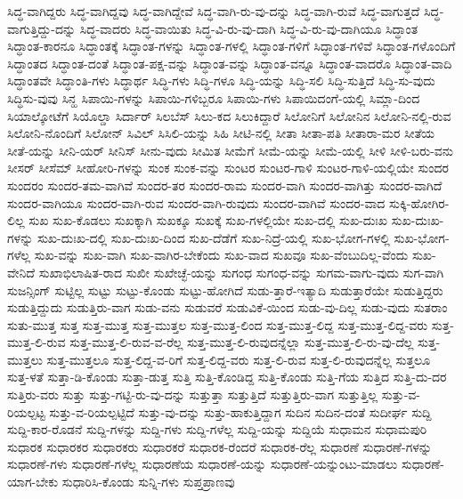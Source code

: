 {ಸಿದ್ಧ-ವಾಗಿದ್ದರು
ಸಿದ್ಧ-ವಾಗಿದ್ದವು
ಸಿದ್ಧ-ವಾಗಿದ್ದೇವೆ
ಸಿದ್ಧ-ವಾಗಿ-ರು-ವು-ದನ್ನು
ಸಿದ್ಧ-ವಾಗಿ-ರುವೆ
ಸಿದ್ಧ-ವಾಗುತ್ತದೆ
ಸಿದ್ಧ-ವಾಗುತ್ತಿದ್ದು-ದನ್ನು
ಸಿದ್ಧ-ವಾದರು
ಸಿದ್ಧ-ವಾಯಿತು
ಸಿದ್ಧ-ವಿ-ರು-ವು-ದಾಗಿ
ಸಿದ್ಧ-ವಿ-ರು-ವು-ದಾಗಿಯೂ
ಸಿದ್ಧಾಂತ
ಸಿದ್ಧಾಂತ-ಕಾರನೂ
ಸಿದ್ಧಾಂತಕ್ಕೆ
ಸಿದ್ಧಾಂತ-ಗಳನ್ನು
ಸಿದ್ಧಾಂತ-ಗಳಲ್ಲಿ
ಸಿದ್ಧಾಂತ-ಗಳಿಗೆ
ಸಿದ್ಧಾಂತ-ಗಳಿವೆ
ಸಿದ್ಧಾಂತ-ಗಳೊಂದಿಗೆ
ಸಿದ್ಧಾಂತದ
ಸಿದ್ಧಾಂತ-ದಂತೆ
ಸಿದ್ಧಾಂತ-ಪಕ್ಷ-ವನ್ನು
ಸಿದ್ಧಾಂತ-ವನ್ನು
ಸಿದ್ಧಾಂತ-ವನ್ನೂ
ಸಿದ್ಧಾಂತ-ವಾದರೊ
ಸಿದ್ಧಾಂತ-ವಾದಿ
ಸಿದ್ಧಾಂತವೇ
ಸಿದ್ಧಾಂತಿ-ಗಳು
ಸಿದ್ಧಾರ್ಥ
ಸಿದ್ಧಿ-ಗಳು
ಸಿದ್ಧಿ-ಗಳೂ
ಸಿದ್ಧಿ-ಯನ್ನು
ಸಿದ್ಧಿ-ಸಲಿ
ಸಿದ್ಧಿ-ಸುತ್ತಿದೆ
ಸಿದ್ಧಿ-ಸು-ವುದು
ಸಿದ್ಧಿಸು-ವುವು
ಸಿನ್ಹ
ಸಿಪಾಯಿ-ಗಳನ್ನು
ಸಿಪಾಯಿ-ಗಳಿಬ್ಬರೂ
ಸಿಪಾಯಿ-ಗಳು
ಸಿಪಾಯಿದಂಗೆ-ಯಲ್ಲಿ
ಸಿಮ್ಲಾ-ದಿಂದ
ಸಿಯಾಲ್ಕೋಟೆಗೆ
ಸಿಯೊಲ್ಡಾ
ಸಿರ್ದಾರ್
ಸಿಲಬೆಸ್
ಸಿಲು-ಕದ
ಸಿಲುಕಿದ್ದಾರೆ
ಸಿಲೋನಿಗೆ
ಸಿಲೋನಿನ
ಸಿಲೋನಿ-ನಲ್ಲಿ-ರುವ
ಸಿಲೋನಿ-ನೊಂದಿಗೆ
ಸಿಲೋನ್
ಸಿವಿಲ್
ಸಿಸಿಲಿ-ಯನ್ನು
ಸಿಹಿ
ಸೀಟಿ-ನಲ್ಲಿ
ಸೀತಾ
ಸೀತಾ-ಪತಿ
ಸೀತಾರಾ-ಮರ
ಸೀತೆಯ
ಸೀತೆ-ಯನ್ನು
ಸೀನಿ-ಯರ್
ಸೀನಿಸ್
ಸೀನು-ವುದು
ಸೀಮಿತ
ಸೀಮೆಗೆ
ಸೀಮೆ-ಯನ್ನು
ಸೀಮೆ-ಯಲ್ಲಿ
ಸೀಳಿ
ಸೀಳಿ-ಬರು-ವನು
ಸೀಸರ್
ಸೀಸೆಮ್
ಸೀಹೋರಿ-ಗಳನ್ನು
ಸುಂಕ
ಸುಂಕ-ವನ್ನು
ಸುಂಟರ
ಸುಂಟರ-ಗಾಳಿ
ಸುಂಟರ-ಗಾಳಿ-ಯಲ್ಲಿಯೇ
ಸುಂದರ
ಸುಂದರಂ
ಸುಂದರ-ತಮ-ವಾಗಿವೆ
ಸುಂದರ-ತರ
ಸುಂದರ-ರಾಮ
ಸುಂದರ-ವಾಗಿ
ಸುಂದರ-ವಾಗಿತ್ತು
ಸುಂದರ-ವಾಗಿದೆ
ಸುಂದರ-ವಾಗಿಯೂ
ಸುಂದರ-ವಾಗಿ-ರುವ
ಸುಂದರ-ವಾಗಿ-ರುವುದು
ಸುಂದರ-ವಾಗಿವೆ
ಸುಂದರ-ವಾದ
ಸುಕ್ಕಿ-ಹೋಗಿರ-ಲಿಲ್ಲ
ಸುಖ
ಸುಖ-ಕೊಡಲು
ಸುಖಕ್ಕಾಗಿ
ಸುಖಕ್ಕೂ
ಸುಖಕ್ಕೆ
ಸುಖ-ಗಳಲ್ಲಿಯೇ
ಸುಖ-ದಲ್ಲಿ
ಸುಖ-ದುಃಖ
ಸುಖ-ದುಃಖ-ಗಳನ್ನು
ಸುಖ-ದುಃಖ-ದಲ್ಲಿ
ಸುಖ-ದುಃಖ-ದಿಂದ
ಸುಖ-ದೆಡೆಗೆ
ಸುಖ-ನಿದ್ರೆ-ಯಲ್ಲಿ
ಸುಖ-ಭೋಗ-ಗಳಲ್ಲಿ
ಸುಖ-ಭೋಗ-ಗಳೆಲ್ಲ
ಸುಖ-ವನ್ನು
ಸುಖ-ವಾಗಿ
ಸುಖ-ವಾಗಿರ-ಬೇಕೆಂದು
ಸುಖ-ವಾದ
ಸುಖವೂ
ಸುಖ-ವೆಂಬುದಿಲ್ಲ-ವೆಂದು
ಸುಖ-ವೇನಿದೆ
ಸುಖಾಭಿಲಾಷಿತ-ರಾದ
ಸುಖೀ
ಸುಖೇಚ್ಛೆ-ಯನ್ನು
ಸುಗಂಧ
ಸುಗಂಧ-ವನ್ನು
ಸುಗಮ-ವಾಗು-ವುದು
ಸುಗ-ವಾಗಿ
ಸುಜನ್ಸಿಂಗ್
ಸುಟ್ಟಿಲ್ಲ
ಸುಟ್ಟು
ಸುಟ್ಟು-ಕೊಂಡು
ಸುಟ್ಟು-ಹೋಗಿದೆ
ಸುಡು-ತ್ತಾರೆ-ಇತ್ಯಾದಿ
ಸುಡುತ್ತಾರೆಯೇ
ಸುಡುತ್ತಿದ್ದರು
ಸುಡುತ್ತಿದ್ದುದು
ಸುಡುತ್ತಿರು-ವಾಗ
ಸುಡು-ವನು
ಸುಡುವರೆ
ಸುಡುವಿಕೆ-ಯಿಂದ
ಸುಡು-ವು-ದಿಲ್ಲ
ಸುಡು-ವುದು
ಸುತರಾಂ
ಸುತು-ಮುತ್ತ
ಸುತ್ತ
ಸುತ್ತ-ಮುತ್ತ
ಸುತ್ತ-ಮುತ್ತಲ
ಸುತ್ತ-ಮುತ್ತ-ಲಿಂದ
ಸುತ್ತ-ಮುತ್ತ-ಲಿದ್ದ
ಸುತ್ತ-ಮುತ್ತ-ಲಿದ್ದ-ವರು
ಸುತ್ತ-ಮುತ್ತ-ಲಿ-ರುವ
ಸುತ್ತ-ಮುತ್ತ-ಲಿ-ರುವ-ವ-ರೆಲ್ಲ
ಸುತ್ತ-ಮುತ್ತ-ಲಿ-ರುವುದನ್ನೆಲ್ಲಾ
ಸುತ್ತ-ಮುತ್ತ-ಲಿ-ರು-ವು-ದೆಲ್ಲ
ಸುತ್ತ-ಮುತ್ತಲು
ಸುತ್ತ-ಮುತ್ತಲೂ
ಸುತ್ತ-ಲಿದ್ದ-ವ-ರಿಗೆ
ಸುತ್ತ-ಲಿದ್ದ-ವರು
ಸುತ್ತ-ಲಿ-ರುವ
ಸುತ್ತ-ಲಿ-ರುವುದನ್ನೆಲ್ಲ
ಸುತ್ತಲೂ
ಸುತ್ತ-ಳತೆ
ಸುತ್ತಾ-ಡಿ-ಕೊಂಡು
ಸುತ್ತಾ-ಡುತ್ತ
ಸುತ್ತಿ
ಸುತ್ತಿ-ಕೊಂಡಿದ್ದ
ಸುತ್ತಿ-ಕೊಂಡು
ಸುತ್ತಿ-ಗೆಯ
ಸುತ್ತಿದ
ಸುತ್ತಿ-ದು-ದರ
ಸುತ್ತಿರು-ವರು
ಸುತ್ತು
ಸುತ್ತು-ಗಟ್ಟಿ-ರು-ವು-ದನ್ನು
ಸುತ್ತುತ್ತಾ
ಸುತ್ತುತ್ತಿದೆ
ಸುತ್ತುತ್ತಿರು-ವಾಗ
ಸುತ್ತುತ್ತಿಲ್ಲ
ಸುತ್ತು-ವ-ರಿಯಲ್ಪಟ್ಟ
ಸುತ್ತು-ವ-ರಿಯಲ್ಪಟ್ಟಿದೆ
ಸುತ್ತು-ವು-ದನ್ನು
ಸುತ್ತು-ಹಾಕುತ್ತಿದ್ದಾಗ
ಸುದಿನ
ಸುದಿನ-ದಂತೆ
ಸುದೀರ್ಘ
ಸುದ್ದಿ
ಸುದ್ದಿ-ಕಾರ-ರೊಡನೆ
ಸುದ್ದಿ-ಗಳನ್ನು
ಸುದ್ದಿ-ಗಳು
ಸುದ್ದಿ-ಗಳೆಲ್ಲ
ಸುದ್ದಿ-ಯನ್ನು
ಸುದ್ದಿಯೆ
ಸುಧಾಮನ
ಸುಧಾಮಪುರಿ
ಸುಧಾರಕ
ಸುಧಾರಕರ
ಸುಧಾರಕರು
ಸುಧಾರಕರೆ
ಸುಧಾರಕ-ರೆಂದರೆ
ಸುಧಾರಕ-ರೆಲ್ಲ
ಸುಧಾರಣೆ
ಸುಧಾರಣೆ-ಗಳನ್ನು
ಸುಧಾರಣೆ-ಗಳು
ಸುಧಾರಣೆ-ಗಳೆಲ್ಲ
ಸುಧಾರಣೆಯ
ಸುಧಾರಣೆ-ಯನ್ನು
ಸುಧಾರಣೆ-ಯನ್ನುಂಟು-ಮಾಡಲು
ಸುಧಾರಣೆ-ಯಾಗ-ಬೇಕು
ಸುಧಾರಿಸಿ-ಕೊಂಡು
ಸುನ್ನಿ-ಗಳು
ಸುಪ್ತಪ್ರಾಣವು
}

